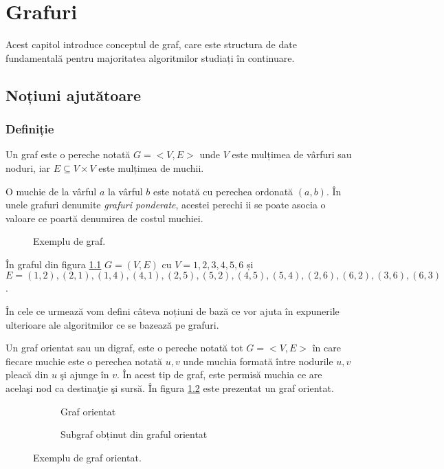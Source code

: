 \chapter{Grafuri}

Acest capitol introduce conceptul de graf, care este structura de date fundamentală pentru majoritatea algoritmilor studiați în continuare.

\section{Noțiuni ajutătoare}

\subsection{Definiție}

Un graf este o pereche notată $G=<V,E>$ unde $V$ este mulțimea de vârfuri sau noduri, iar $E\subseteq V \times V$ este mulțimea de muchii.

O muchie de la vârful $a$ la vârful $b$ este notată cu perechea ordonată $(a,b)$. În unele grafuri denumite \textit{grafuri ponderate}, acestei perechi ii se poate asocia o valoare ce poartă denumirea de costul muchiei.

\begin{figure}[H] 
	\centering	
	{
	}
	\caption{Exemplu de graf.} 
	\label{fig:simplegraph}
\end{figure}

În graful din figura \ref{fig:simplegraph} $G=(V,E)$ cu $V={1,2,3,4,5,6}$ și $E=(1,2),(2,1),(1,4),(4,1),(2,5),(5,2),(4,5),(5,4),(2,6),(6,2),(3,6),(6,3)$.

În cele ce urmează vom defini câteva noțiuni de bază ce vor ajuta în expunerile ulterioare ale algoritmilor ce se bazează pe grafuri.

Un graf orientat sau un digraf, este o pereche notată tot $G=<V,E>$  în care fiecare muchie este o perechea notată ${u,v}$ unde muchia formată între nodurile $u,v$ pleacă din $u$ şi ajunge în $v$. În acest tip de graf, este permisă muchia ce are acelaşi nod ca destinaţie şi sursă. În figura \ref{fig:ograf} este prezentat un graf orientat.

\begin{figure}[H] 
	 \begin{subfigure}{0.5\textwidth}
		\caption{Graf orientat}
		\label{fig:ograf}
	\end{subfigure}
	\begin{subfigure}{0.5\textwidth}
		\caption{Subgraf obținut din graful orientat}
		\label{fig:subgraf}
	\end{subfigure}
	\caption{Exemplu de graf orientat.} 
	\label{fig:orientedgraph}
\end{figure}

